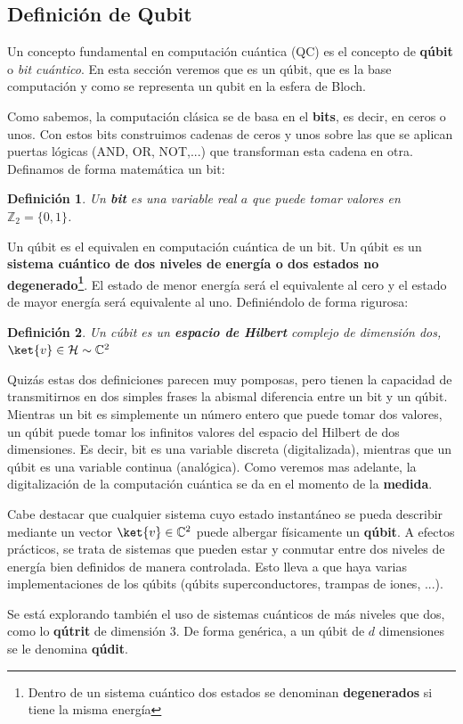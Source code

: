 \documentclass[a4paper,11pt]{book} %
\newtheorem{definicion_contador}{Definición}
\newcommand{\Definicion}[1]{
		\begin{mybox_gray2}{}
			\begin{definicion_contador}
				 #1 
			\end{definicion_contador} 
		\end{mybox_gray2}
	}
\numberwithin{equation}{chapter}
\begin{document}
        \subsection{Definición de Qubit}
Un concepto fundamental en computación cuántica (QC) es el concepto de \textbf{qúbit} o \textit{bit cuántico}.
En esta sección veremos que es un qúbit, que es la base computación y como se representa un qubit en la esfera de Bloch.


Como sabemos, la computación clásica se de basa en el \textbf{bits}, es decir, en ceros o unos. Con estos bits construimos cadenas de ceros y unos sobre las que se aplican puertas lógicas (AND, OR, NOT,...) que transforman esta cadena en otra. Definamos de forma matemática un bit:
	\Definicion{
	Un \textbf{bit} es una variable  real $a$ que puede tomar valores en $ {\mathbb Z}_2= \{0, 1\}$.
	}

Un qúbit es el equivalen en computación cuántica de un bit. Un qúbit es un \textbf{sistema cuántico de dos niveles de energía o dos estados no degenerado\footnote{Dentro de un sistema cuántico dos estados se denominan \textbf{degenerados} si tiene la misma energía}}. El estado de menor energía será el equivalente al cero y el estado de mayor energía será equivalente al uno. Definiéndolo de forma rigurosa:
	\Definicion{
	Un cúbit es un \textbf{espacio de Hilbert} complejo de dimensión dos, $\ket{v} \in \mathcal{H} \sim  \mathbb{C}^2$
	}

Quizás estas dos definiciones parecen muy pomposas, pero tienen la capacidad de transmitirnos en dos simples frases la abismal diferencia entre un bit y un qúbit. Mientras un bit es simplemente un número entero que puede tomar dos valores, un qúbit puede tomar los infinitos valores del espacio del Hilbert de dos dimensiones. Es decir, bit es una variable discreta (digitalizada), mientras que un qúbit es una variable continua (analógica). Como veremos mas adelante, la digitalización de la computación cuántica se da en el momento de la \textbf{medida}.

Cabe destacar que cualquier sistema  cuyo estado instantáneo se pueda describir mediante un vector $\ket{v}\in {\mathbb C}^2$ puede albergar físicamente un \textbf{qúbit}. A efectos prácticos,  se trata de sistemas que pueden estar y conmutar entre dos niveles de energía bien definidos de manera controlada. Esto lleva a que haya varias implementaciones de los qúbits (qúbits superconductores, trampas de iones, ...). 

Se está explorando también el uso de sistemas cuánticos de más niveles que dos, como lo \textbf{qútrit} de dimensión 3. De forma genérica, a un qúbit de $d$ dimensiones se le denomina \textbf{qúdit}.
\end{document}
